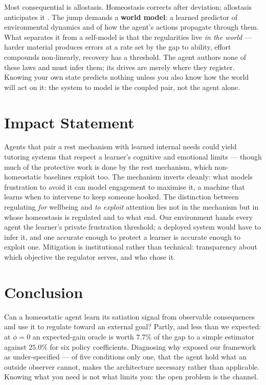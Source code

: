 \documentclass{article}
\begin{document}
Most consequential is allostasis. Homeostasis corrects after deviation; allostasis anticipates it \cite{SterlingEyer1988}. The jump demands a \textbf{world model}: a learned predictor of environmental dynamics and of how the agent's actions propagate through them. What separates it from a self-model is that the regularities live \emph{in the world} --- harder material produces errors at a rate set by the gap to ability, effort compounds non-linearly, recovery has a threshold. The agent authors none of these laws and must infer them; its drives are merely where they register. Knowing your own state predicts nothing unless you also know how the world will act on it: the system to model is the coupled pair, not the agent alone.

\section{Impact Statement}
\label{sec:impact}

Agents that pair a rest mechanism with learned internal needs could yield tutoring systems that respect a learner's cognitive and emotional limits --- though much of the protective work is done by the rest mechanism, which non-homeostatic baselines exploit too. The mechanism inverts cleanly: what models frustration to avoid it can model engagement to maximise it, a machine that learns when to intervene to keep someone hooked. The distinction between regulating \emph{for} wellbeing and \emph{to exploit} attention lies not in the mechanism but in whose homeostasis is regulated and to what end. Our environment hands every agent the learner's private frustration threshold; a deployed system would have to infer it, and one accurate enough to protect a learner is accurate enough to exploit one. Mitigation is institutional rather than technical: transparency about which objective the regulator serves, and who chose it.

\section{Conclusion}

Can a homeostatic agent learn its satiation signal from observable consequences and use it to regulate toward an external goal? Partly, and less than we expected: at $\phi{=}0$ an expected-gain oracle is worth $7.7\%$ of the gap to a simple estimator against $25.0\%$ for six policy coefficients. Diagnosing why exposed our framework as under-specified --- of five conditions only one, that the agent hold what an outside observer cannot, makes the architecture necessary rather than applicable. Knowing what you need is not what limits you: the open problem is the channel.
\end{document}
